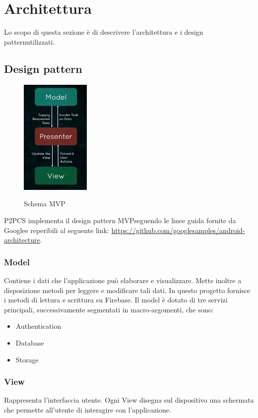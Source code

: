 \section{Architettura}
Lo scopo di questa sezione è di descrivere l'architettura e i design pattern\glosp utilizzati.
\subsection{Design pattern}
\begin{figure}[H]
	\centering
	\includegraphics[width=0.3\textwidth]
	{res/images/mvp.png}\\
	\caption{Schema MVP}
	\label{Schema MVP}
\end{figure}
P2PCS implementa il design pattern MVP\glosp seguendo le linee guida fornite da Google\glosp e reperibili al seguente link: \url{https://github.com/googlesamples/android-architecture}.
\newline
\subsubsection{Model}
Contiene i dati che l’applicazione può elaborare e visualizzare. Mette inoltre a disposizione metodi per leggere e modificare tali dati.
In questo progetto fornisce i metodi di lettura e scrittura su Firebase.
Il model è dotato di tre servizi principali, successivamente segmentati in macro-argomenti, che sono:
\begin{itemize}
	\item Authentication
	\item Database
	\item Storage
\end{itemize}
\subsubsection{View}
Rappresenta l’interfaccia utente. Ogni View disegna sul dispositivo una schermata che permette all’utente di interagire con l’applicazione.
